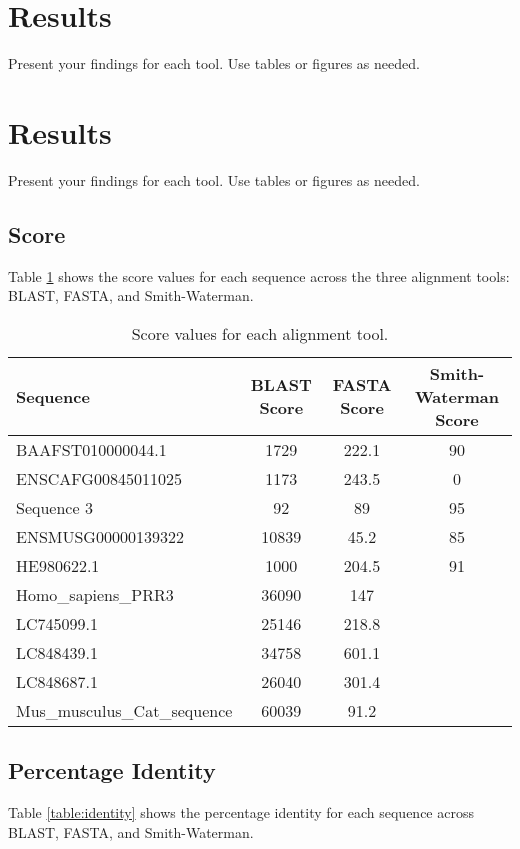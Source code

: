 \documentclass[a4paper,12pt]{article}
\begin{document}
\section{Results}
Present your findings for each tool. Use tables or figures as needed.

\section{Results}
Present your findings for each tool. Use tables or figures as needed.

\subsection{Score}
Table \ref{table:score} shows the score values for each sequence across the three alignment tools: BLAST, FASTA, and Smith-Waterman.

\begin{table}[h!]
\centering
\begin{tabular}{|l|c|c|c|}
    \hline
    \textbf{Sequence} & \textbf{BLAST Score} & \textbf{FASTA Score} & \textbf{Smith-Waterman Score} \\
    \hline
    
    BAAFST010000044.1 & 1729 & 222.1 & 90 \\
    ENSCAFG00845011025 & 1173 & 243.5 & 0 \\
    Sequence 3 & 92 & 89 & 95 \\
    ENSMUSG00000139322 & 10839& 45.2& 85 \\
    HE980622.1& 1000& 204.5& 91 \\
    Homo_sapiens_PRR3& 36090& 147&\\
    LC745099.1& 25146& 218.8&\\
    LC848439.1& 34758& 601.1&\\
    LC848687.1& 26040& 301.4&\\
    Mus_musculus_Cat_sequence& 60039& 91.2&\\
    \hline
\end{tabular}
\caption{Score values for each alignment tool.}
\label{table:score}
\end{table}

\subsection{Percentage Identity}
Table \ref{table:identity} shows the percentage identity for each sequence across BLAST, FASTA, and Smith-Waterman.
\end{document}
